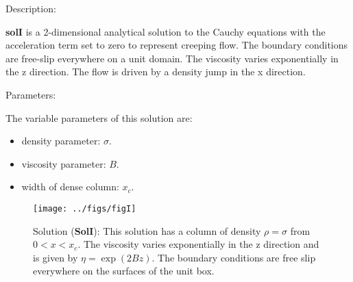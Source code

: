   {\large \fontB Description:}
  
  {\bf solI} is a 2-dimensional analytical solution to the Cauchy equations with the acceleration term set to zero
  to represent creeping flow. The boundary conditions are free-slip everywhere on a unit domain. 
  The viscosity varies exponentially in the z direction.
  The flow is driven by a density jump in the x direction.

 {\large \fontB Parameters:}
  
 The variable parameters of this solution are:
 \begin{itemize}
   \item{density parameter: $ \sigma $.}
   \item{viscosity parameter: $B$.}
   \item{width of dense column: $x_c$.}
 \end{itemize}

  \begin{SCfigure}[][h]
    \texttt{[image: ../figs/figI]}
    \caption[Short caption]{\label{figI} 
      Solution ({\bf SolI}):
      This solution has a column of density $\rho = \sigma$ from $0 < x < x_c$.
      The viscosity varies exponentially in the z direction and is given by
      $\eta = \exp (2 B z)$.
      The boundary conditions are free slip everywhere on the surfaces of the unit box.}
  \end{SCfigure} 
  

